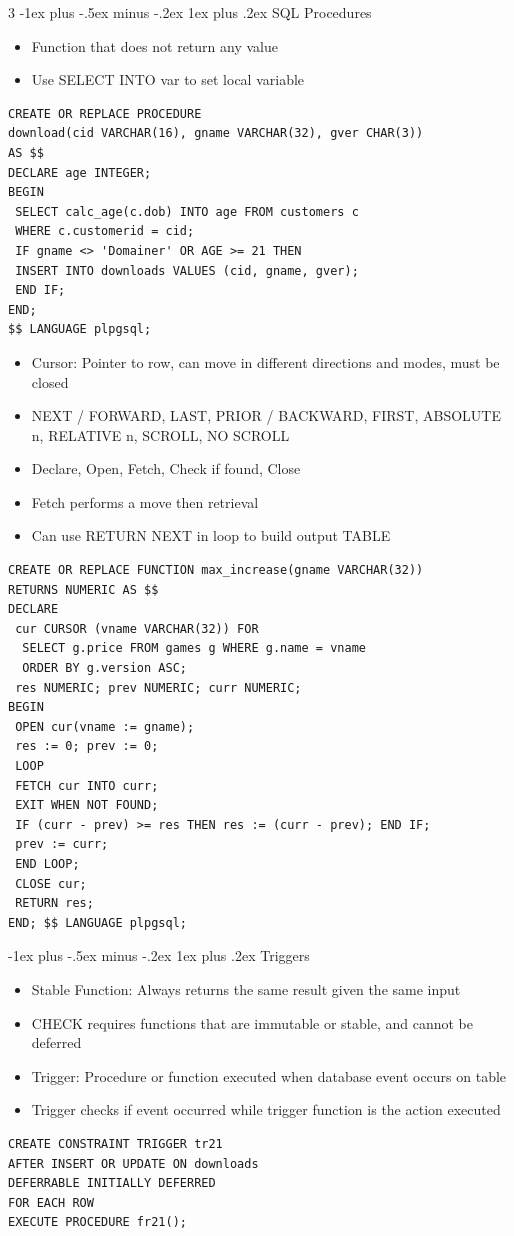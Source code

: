 \documentclass[10pt, landscape]{article}
\makeatletter
\renewcommand{\subsection}{\@startsection{subsection}{3}{0mm}%
                                {-1ex plus -.5ex minus -.2ex}%
                                {1ex plus .2ex}%
                                {\normalfont\small\bfseries}}%
\makeatother
\begin{document}
\begin{multicols*}{3}
\subsection{SQL Procedures}
\begin{itemize}
    \item Function that does not return any value
    \item Use SELECT INTO var to set local variable
\end{itemize}
\begin{verbatim}
CREATE OR REPLACE PROCEDURE
download(cid VARCHAR(16), gname VARCHAR(32), gver CHAR(3))
AS $$
DECLARE age INTEGER;
BEGIN
 SELECT calc_age(c.dob) INTO age FROM customers c
 WHERE c.customerid = cid;
 IF gname <> 'Domainer' OR AGE >= 21 THEN
 INSERT INTO downloads VALUES (cid, gname, gver);
 END IF;
END;
$$ LANGUAGE plpgsql;
\end{verbatim}
\begin{itemize}
    \item Cursor: Pointer to row, can move in different directions and modes, must be closed
    \item NEXT / FORWARD, LAST, PRIOR / BACKWARD, FIRST, ABSOLUTE n, RELATIVE n, SCROLL, NO SCROLL
    \item Declare, Open, Fetch, Check if found, Close
    \item Fetch performs a move then retrieval
    \item Can use RETURN NEXT in loop to build output TABLE
\end{itemize}
\begin{verbatim}
CREATE OR REPLACE FUNCTION max_increase(gname VARCHAR(32))
RETURNS NUMERIC AS $$
DECLARE
 cur CURSOR (vname VARCHAR(32)) FOR
  SELECT g.price FROM games g WHERE g.name = vname
  ORDER BY g.version ASC;
 res NUMERIC; prev NUMERIC; curr NUMERIC;
BEGIN
 OPEN cur(vname := gname);
 res := 0; prev := 0;
 LOOP
 FETCH cur INTO curr;
 EXIT WHEN NOT FOUND;
 IF (curr - prev) >= res THEN res := (curr - prev); END IF;
 prev := curr;
 END LOOP;
 CLOSE cur;
 RETURN res;
END; $$ LANGUAGE plpgsql;
\end{verbatim}

\subsection{Triggers}
\begin{itemize}
    \item Stable Function: Always returns the same result given the same input
    \item CHECK requires functions that are immutable or stable, and cannot be deferred
    \item Trigger: Procedure or function executed when database event occurs on table
    \item Trigger checks if event occurred while trigger function is the action executed
\end{itemize}
\begin{verbatim}
CREATE CONSTRAINT TRIGGER tr21
AFTER INSERT OR UPDATE ON downloads
DEFERRABLE INITIALLY DEFERRED
FOR EACH ROW
EXECUTE PROCEDURE fr21();


\end{verbatim}
\end{multicols*}
\end{document}
